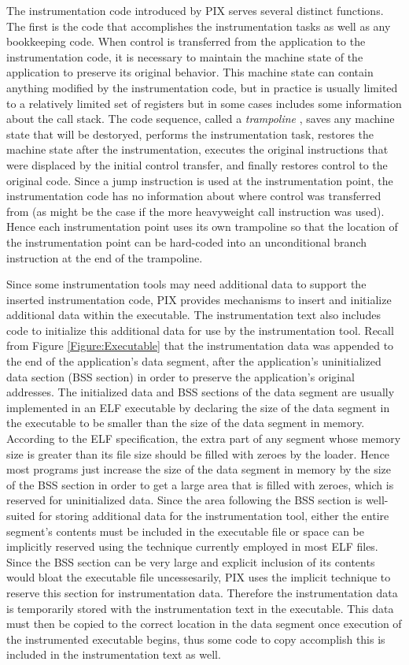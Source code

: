 The instrumentation code introduced by PIX serves several distinct functions. The first
is the code that accomplishes the instrumentation tasks as well as any bookkeeping code.
When control is transferred from the application to the
instrumentation code, it is necessary to maintain the machine state of
the application to preserve its original behavior. This machine state
can contain anything modified by the instrumentation code, but in practice is
usually limited to a relatively limited set of registers but in some cases includes
some information about the call stack. The code sequence, called a \textit{trampoline} \cite{buck2000api}, 
saves any machine state that will be destoryed, performs the instrumentation task, restores
the machine state after the instrumentation, executes the
original instructions that were displaced by the initial control transfer,
and finally restores control to the original code. Since a jump instruction is used at the instrumentation point, the
instrumentation code has no information about where control was transferred from
(as might be the case if the more heavyweight call instruction was used). Hence
each instrumentation point uses its own trampoline so that the location of the
instrumentation point can be hard-coded into an unconditional branch instruction
at the end of the trampoline.

Since some instrumentation tools may need additional data to support the inserted instrumentation code,
PIX provides mechanisms to insert and initialize additional data within the executable.
The instrumentation text also includes code to initialize this additional data for use by the
instrumentation tool. Recall from Figure \ref{Figure:Executable} that the instrumentation
data was appended to the end of the application's data segment, after the
application's uninitialized data section (BSS section) in order to preserve the application's 
original addresses. The initialized data and BSS
sections of the data segment are usually implemented in an ELF executable by declaring the size of
the data segment in the executable to be smaller than the size of the data
segment in memory. According to the ELF specification\cite{standard1995executable}, the extra part of any
segment whose memory size is greater than its file size should be filled with
zeroes by the loader. Hence most programs just increase the size of the data
segment in memory by the size of the BSS section in order to get a large
area that is filled with zeroes, which is reserved for uninitialized data. Since the area following the BSS section is well-suited for
storing additional data for the instrumentation tool, either the entire
segment's contents must be included in the executable file or space can be implicitly reserved using the
technique currently employed in most ELF files.
Since the BSS section can be very large and explicit inclusion of its contents
would bloat the executable file uncessesarily, PIX uses the implicit
technique to reserve this section for instrumentation data. Therefore the instrumentation data is
temporarily stored with the instrumentation text in the
executable. This data must then be copied to the correct location in the data segment once execution
of the instrumented executable begins, thus some code to copy accomplish this is included in the
instrumentation text as well.
